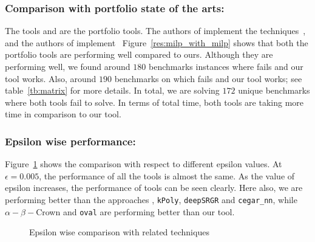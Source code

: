 \subsubsection{Comparison with portfolio state of the arts: }
The tools \alphabeta{} and \ovaltool{} are the portfolio tools. 
The authors of \alphabeta{} implement
the techniques~\cite{alphabetapapers}, and the authors of \ovaltool{} implement~\cite{ovalpapers}
Figure~\ref{res:milp_with_milp} shows that both the portfolio tools are performing well compared to ours. 
Although they are performing well, we found around $180$ benchmarks instances where \alphabeta{} fails and 
our tool works. Also, around $190$ benchmarks on which \ovaltool{} fails and our tool works; see table~\ref{tb:matrix}
for more details. In total, we are solving $172$ unique benchmarks where both tools fail to solve. 
In terms of total time, both tools are taking more time in comparison to our tool. 



\subsubsection{Epsilon wise performance: }
Figure~\ref{res:ep:milp_with_milp} shows the comparison with respect to different epsilon values. 
At $\epsilon=0.005$, the performance of all the tools is almost the same. As the value of epsilon increases, the 
performance of tools can be seen clearly. Here also, we are performing better than the approaches \deeppoly{}, 
\texttt{kPoly}, \texttt{deepSRGR} and \texttt{cegar\_nn},
while $\alpha - \beta -$Crown and \texttt{oval} are performing better than our tool. 


\begin{figure}
    \centering
    
    \caption{Epsilon wise comparison with related techniques}
    \label{res:ep:milp_with_milp}
\end{figure}


